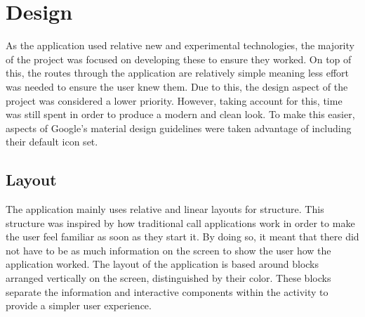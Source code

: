 \documentclass[]{report}
\begin{document}
	\chapter{Design}
		As the application used relative new and experimental technologies, the majority of the project was focused on developing these to ensure they worked. On top of this, the routes through the application are relatively simple meaning less effort was needed to ensure the user knew them. Due to this, the design aspect of the project was considered a lower priority. However, taking account for this, time was still spent in order to produce a modern and clean look. To make this easier, aspects of Google's material design guidelines were taken advantage of including their default icon set.
		
		\section{Layout}
		The application mainly uses relative and linear layouts for structure. This structure was inspired by how traditional call applications work in order to make the user feel familiar as soon as they start it. By doing so, it meant that there did not have to be as much information on the screen to show the user how the application worked. The layout of the application is based around blocks arranged vertically on the screen, distinguished by their color. These blocks separate the information and interactive components within the activity to provide a simpler user experience. 
		
\end{document}
